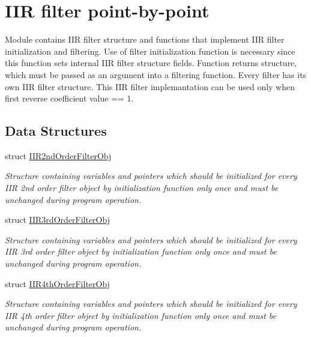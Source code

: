 \hypertarget{group___i_i_rfilter_pt_by_pt}{}\section{I\+IR filter point-\/by-\/point}
\label{group___i_i_rfilter_pt_by_pt}


Module contains I\+IR filter structure and functions that implement I\+IR filter initialization and filtering. Use of filter initialization function is necessary since this function sets internal I\+IR filter structure fields. Function returns structure, which must be passed as an argument into a filtering function. Every filter has it\textquotesingle{}s own I\+IR filter structure. This I\+IR filter implemantation can be used only when first reverse coefficient value == 1.  


\subsection*{Data Structures}
\begin{DoxyCompactItemize}
\item 
struct \mbox{\hyperlink{struct_i_i_r2nd_order_filter_obj}{I\+I\+R2nd\+Order\+Filter\+Obj}}
\begin{DoxyCompactList}\small\item\em Structure containing variables and pointers which should be initialized for every I\+IR 2nd order filter object by initialization function only once and must be unchanged during program operation. \end{DoxyCompactList}\item 
struct \mbox{\hyperlink{struct_i_i_r3rd_order_filter_obj}{I\+I\+R3rd\+Order\+Filter\+Obj}}
\begin{DoxyCompactList}\small\item\em Structure containing variables and pointers which should be initialized for every I\+IR 3rd order filter object by initialization function only once and must be unchanged during program operation. \end{DoxyCompactList}\item 
struct \mbox{\hyperlink{struct_i_i_r4th_order_filter_obj}{I\+I\+R4th\+Order\+Filter\+Obj}}
\begin{DoxyCompactList}\small\item\em Structure containing variables and pointers which should be initialized for every I\+IR 4th order filter object by initialization function only once and must be unchanged during program operation. \end{DoxyCompactList}\end{DoxyCompactItemize}
